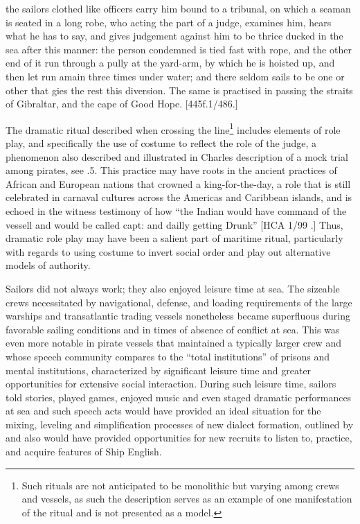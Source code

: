 the sailors clothed like officers carry him bound to a tribunal, on which a seaman is seated in a long robe, who acting the part of a judge, examines him, hears what he has to say, and gives judgement against him to be thrice ducked in the sea after this manner: the person condemned is tied fast with rope, and the other end of it run through a pully at the yard-arm, by which he is hoisted up, and then let run amain three times under water; and there seldom sails to be one or other that gies the rest this diversion. The same is practised in passing the straits of Gibraltar, and the cape of Good Hope. [445f.1/486.] 

The dramatic ritual described when crossing the line\footnote{Such rituals are not anticipated to be monolithic but varying among crews and vessels, as such the description serves as an example of one manifestation of the ritual and is not presented as a model.}  includes elements of role play, and specifically the use of costume to reflect the role of the judge, a phenomenon also described and illustrated in Charles  description of a mock trial among pirates, see .5. This practice may have roots in the ancient practices of African and European nations that crowned a king-for-the-day, a role that is still celebrated in carnaval cultures across the Americas and Caribbean islands, and is echoed in the witness testimony of how “the Indian would have command of the vessell and would be called capt: and dailly getting Drunk” [HCA 1/99 \citealt{Barbados1733}.] Thus, dramatic role play may have been a salient part of maritime ritual, particularly with regards to using costume to invert social order and play out alternative models of authority. 

Sailors did not always work; they also enjoyed leisure time at sea. The sizeable crews necessitated by navigational, defense, and loading requirements of the large warships and transatlantic trading vessels nonetheless became superfluous during favorable sailing conditions and in times of absence of conflict at sea. This was even more notable in pirate vessels that maintained a typically larger crew and whose speech community \citet{Burg2001} compares to the “total institutions” of prisons and mental institutions, characterized by significant leisure time and greater opportunities for extensive social interaction. During such leisure time, sailors told stories, played games, enjoyed music and even staged dramatic performances at sea \citep[155]{Rediker2004} and such speech acts would have provided an ideal situation for the mixing, leveling and simplification processes of new dialect formation, outlined by \citet{Trudgill1986} and also would have provided opportunities for new recruits to listen to, practice, and acquire features of Ship English.

